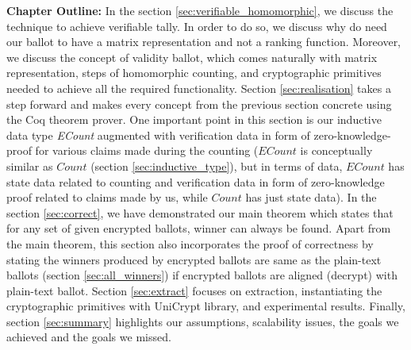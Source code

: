 \textbf{Chapter Outline:} In the section \ref{sec:verifiable_homomorphic}, 
we discuss the technique to achieve verifiable tally. In order to do so, 
we discuss why do need our ballot to have a matrix representation 
and not a ranking function. Moreover, we discuss the concept 
of validity ballot, which comes naturally with matrix representation, 
steps of homomorphic counting, and cryptographic primitives needed 
to achieve all the required functionality. Section \ref{sec:realisation} 
takes a step forward and makes every concept from the previous section
concrete using the Coq theorem prover. One important point 
in this section is our inductive data type \textit{ECount}
augmented with verification data in form of zero-knowledge-proof 
for various claims made during the counting 
($ECount$ is conceptually similar as $Count$ (section \ref{sec:inductive_type}), but 
in terms of data, $ECount$ has state data related to counting and verification data
in form of zero-knowledge proof related to claims made by us, while $Count$ 
has just state data).  In the section \ref{sec:correct}, we have demonstrated 
our main theorem which states that for any set of given encrypted ballots, 
winner can always be found. Apart from the main theorem, this section 
also incorporates the proof of correctness by stating 
the winners produced by encrypted ballots are same as 
 the plain-text ballots (section \ref{sec:all_winners}) if 
 encrypted ballots are aligned (decrypt) with plain-text ballot. 
 Section \ref{sec:extract} focuses on extraction, instantiating 
 the cryptographic primitives with UniCrypt library, and 
 experimental results. Finally, section \ref{sec:summary} 
 highlights our assumptions, scalability issues, the 
 goals we achieved and the goals we missed. 


 


